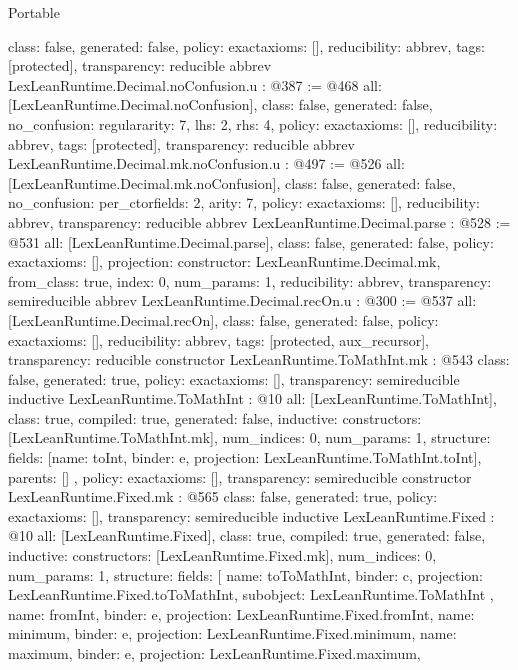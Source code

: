 \begin{lexlean}{Portable}
\begin{coremodule}
{  class: false,
  generated: false,
  policy: exact{axioms: []},
  reducibility: abbrev{},
  tags: [protected],
  transparency: reducible
}
abbrev LexLeanRuntime.Decimal.noConfusion.{u} : @387 := @468 {
  all: [LexLeanRuntime.Decimal.noConfusion],
  class: false,
  generated: false,
  no_confusion: regular{arity: 7, lhs: 2, rhs: 4},
  policy: exact{axioms: []},
  reducibility: abbrev{},
  tags: [protected],
  transparency: reducible
}
abbrev LexLeanRuntime.Decimal.mk.noConfusion.{u} : @497 := @526 {
  all: [LexLeanRuntime.Decimal.mk.noConfusion],
  class: false,
  generated: false,
  no_confusion: per_ctor{fields: 2, arity: 7},
  policy: exact{axioms: []},
  reducibility: abbrev{},
  transparency: reducible
}
abbrev LexLeanRuntime.Decimal.parse : @528 := @531 {
  all: [LexLeanRuntime.Decimal.parse],
  class: false,
  generated: false,
  policy: exact{axioms: []},
  projection: {constructor: LexLeanRuntime.Decimal.mk, from_class: true, index: 0, num_params: 1},
  reducibility: abbrev{},
  transparency: semireducible
}
abbrev LexLeanRuntime.Decimal.recOn.{u} : @300 := @537 {
  all: [LexLeanRuntime.Decimal.recOn],
  class: false,
  generated: false,
  policy: exact{axioms: []},
  reducibility: abbrev{},
  tags: [protected, aux_recursor],
  transparency: reducible
}
constructor LexLeanRuntime.ToMathInt.mk : @543 {
  class: false,
  generated: true,
  policy: exact{axioms: []},
  transparency: semireducible
}
inductive LexLeanRuntime.ToMathInt : @10 {
  all: [LexLeanRuntime.ToMathInt],
  class: true,
  compiled: true,
  generated: false,
  inductive: {
    constructors: [LexLeanRuntime.ToMathInt.mk],
    num_indices: 0,
    num_params: 1,
    structure: {
      fields: [{name: toInt, binder: e, projection: LexLeanRuntime.ToMathInt.toInt}],
      parents: []
    }
  },
  policy: exact{axioms: []},
  transparency: semireducible
}
constructor LexLeanRuntime.Fixed.mk : @565 {
  class: false,
  generated: true,
  policy: exact{axioms: []},
  transparency: semireducible
}
inductive LexLeanRuntime.Fixed : @10 {
  all: [LexLeanRuntime.Fixed],
  class: true,
  compiled: true,
  generated: false,
  inductive: {
    constructors: [LexLeanRuntime.Fixed.mk],
    num_indices: 0,
    num_params: 1,
    structure: {
      fields: [
        {
          name: toToMathInt,
          binder: c,
          projection: LexLeanRuntime.Fixed.toToMathInt,
          subobject: LexLeanRuntime.ToMathInt
        },
        {name: fromInt, binder: e, projection: LexLeanRuntime.Fixed.fromInt},
        {name: minimum, binder: e, projection: LexLeanRuntime.Fixed.minimum},
        {name: maximum, binder: e, projection: LexLeanRuntime.Fixed.maximum},
}}}
\end{coremodule}
\end{lexlean}
